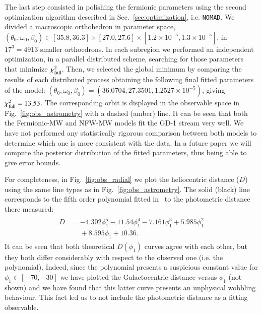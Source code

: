 \documentclass[twocolumn]{aa}
\begin{document}
The last step consisted in polishing the fermionic parameters using the second optimization algorithm described in Sec.~\ref{sec:optimization}, i.e. \texttt{NOMAD}. We divided a  macroscopic orthohedron in parameter space, $(\theta_0, \omega_0, \beta_0) \in [35.8, 36.3]\times[27.0, 27.6]\times [1.2\times10^{-5}, 1.3\times10^{-5}]$, in $17^3=4913$ smaller orthoedrons. In each subregion we performed an independent optimization, in a parallel distributed scheme, searching for those parameters that minimize $\chi^2_{\rm{full}}$. Then, we selected the global minimum by comparing the results of each distributed process obtaining the following final fitted parameters of the model: $(\theta_0, \omega_0, \beta_0)= (36.0704, 27.3501, 1.2527\times10^{-5})$, giving $\chi^2_{\rm{full}}= 13.53$.
The corresponding orbit is displayed in the observable space in
Fig.~\ref{fig:obs_astrometry} with a dashed (amber) line. It can be seen that both the Fermionic-MW and NFW-MW models fit the GD-1 stream very well.
We have not performed any statistically rigorous comparison between both models to determine which one is more consistent with the data. In a future paper we will compute the posterior distribution of the fitted parameters, thus being able to give error bounds.


For completeness, in Fig.~\ref{fig:obs_radial} we plot the heliocentric distance ($D$) using the same line types as in Fig.~\ref{fig:obs_astrometry}. The solid (black) line corresponds to the fifth order polynomial fitted in~\cite{Ibata_2020} to the photometric distance there measured:
\begin{align}
 \label{phot_dist}
    \begin{split}
        D &= -4.302\phi_1^5 - 11.54\phi_1^4 - 7.161\phi_1^3 + 5.985\phi_1^2\\
      &\phantom{=} + 8.595\phi_1+10.36.
    \end{split}
\end{align}
It can be seen that both theoretical $D(\phi_1)$ curves agree with each other, but they both differ considerably with respect to the observed one (i.e. the polynomial). Indeed, since the polynomial presents a suspicious constant value for $\phi_1 \in [-70,-30]$ we have plotted the Galactocentric distance versus $\phi_1$ (not shown) and we have found that this latter curve presents an unphysical wobbling behaviour. This fact led us to not include the photometric distance as a fitting observable.
\end{document}

